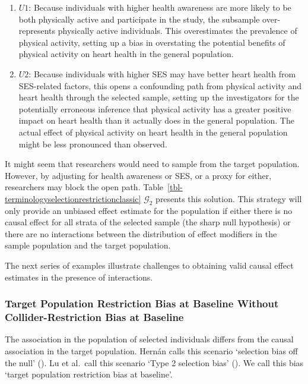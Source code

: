 \documentclass[
  single column]{article}
\begin{document}
\begin{enumerate}
\def\labelenumi{\arabic{enumi}.}
\item
  \textbf{\(U1\)}: Because individuals with higher health awareness are
  more likely to be both physically active and participate in the study,
  the subsample over-represents physically active individuals. This
  overestimates the prevalence of physical activity, setting up a bias
  in overstating the potential benefits of physical activity on heart
  health in the general population.
\item
  \textbf{\(U2\)}: Because individuals with higher SES may have better
  heart health from SES-related factors, this opens a confounding path
  from physical activity and heart health through the selected sample,
  setting up the investigators for the potentially erroneous inference
  that physical activity has a greater positive impact on heart health
  than it actually does in the general population. The actual effect of
  physical activity on heart health in the general population might be
  less pronounced than observed.
\end{enumerate}

It might seem that researchers would need to sample from the target
population. However, by adjusting for health awareness or SES, or a
proxy for either, researchers may block the open path.
Table~\ref{tbl-terminologyselectionrestrictionclassic} \(\mathcal{G}_2\)
presents this solution. This strategy will only provide an unbiased
effect estimate for the population if either there is no causal effect
for all strata of the selected sample (the sharp null hypothesis) or
there are no interactions between the distribution of effect modifiers
in the sample population and the target population.

The next series of examples illustrate challenges to obtaining valid
causal effect estimates in the presence of interactions.

\subsubsection{Target Population Restriction Bias at Baseline Without
Collider-Restriction Bias at
Baseline}\label{target-population-restriction-bias-at-baseline-without-collider-restriction-bias-at-baseline}

\begin{table}

\caption{\label{tbl-terminologyselectionrestrictionbaseline}The
association in the population of selected individuals differs from the
causal association in the target population. Hernán calls this scenario
`selection bias off the null' (). Lu et al.~call this scenario `Type 2 selection bias'
(). We call this bias
`target population restriction bias at baseline'.}

\centering{

\terminologyselectionrestrictionbaseline

}

\end{table}%
\end{document}
